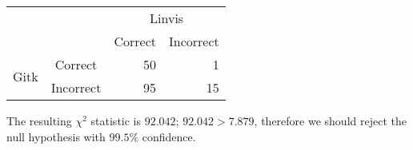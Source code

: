 \begin{center}
  \begin{tabular}{cc|rr}
                          &           & \multicolumn{2}{c}{Linvis}\\
                          &           & Correct                      & Incorrect\\\hline
    \multirow{2}{*}{Gitk} & Correct   & 50                           & 1\\
                          & Incorrect & 95                           & 15\\
  \end{tabular}
\end{center}

The resulting $\chi^2$ statistic is $92.042$; $92.042 > 7.879$,
therefore we should reject the null hypothesis with $99.5\%$ confidence.
